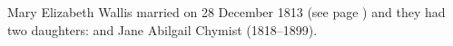 
Mary Elizabeth Wallis married  on 28 December 1813 (see page \pageref{Samuel_Chymist}) and they had two daughters:
 and Jane Abilgail Chymist (1818--1899).
